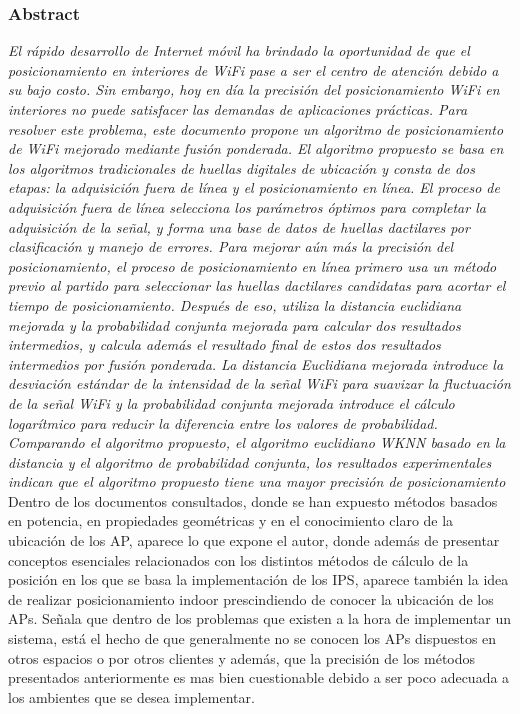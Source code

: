 \subsubsection{Abstract}
\emph{El rápido desarrollo de Internet móvil ha brindado la oportunidad de que el posicionamiento en interiores de WiFi pase a ser el centro de atención debido a su bajo costo. Sin embargo, hoy en día la precisión del posicionamiento WiFi en interiores no puede satisfacer las demandas de aplicaciones prácticas. Para resolver este problema, este documento propone un algoritmo de posicionamiento de WiFi mejorado mediante fusión ponderada. El algoritmo propuesto se basa en los algoritmos tradicionales de huellas digitales de ubicación y consta de dos etapas: la adquisición fuera de línea y el posicionamiento en línea. El proceso de adquisición fuera de línea selecciona los parámetros óptimos para completar la adquisición de la señal, y forma una base de datos de huellas dactilares por clasificación y manejo de errores. Para mejorar aún más la precisión del posicionamiento, el proceso de posicionamiento en línea primero usa un método previo al partido para seleccionar las huellas dactilares candidatas para acortar el tiempo de posicionamiento. Después de eso, utiliza la distancia euclidiana mejorada y la probabilidad conjunta mejorada para calcular dos resultados intermedios, y calcula además el resultado final de estos dos resultados intermedios por fusión ponderada. La distancia Euclidiana mejorada introduce la desviación estándar de la intensidad de la señal WiFi para suavizar la fluctuación de la señal WiFi y la probabilidad conjunta mejorada introduce el cálculo logarítmico para reducir la diferencia entre los valores de probabilidad. Comparando el algoritmo propuesto, el algoritmo euclidiano WKNN basado en la distancia y el algoritmo de probabilidad conjunta, los resultados experimentales indican que el algoritmo propuesto tiene una mayor precisión de posicionamiento}\\

Dentro de los documentos consultados, donde se han expuesto métodos basados en potencia, en propiedades geométricas y en el conocimiento claro de la ubicación de los AP, aparece lo que expone el autor, donde además de presentar conceptos esenciales relacionados con los distintos métodos de cálculo de la posición en los que se basa la implementación de los IPS, aparece también la idea de realizar posicionamiento indoor prescindiendo de conocer la ubicación de los APs. Señala que dentro de los problemas que existen a la hora de implementar un sistema, está el hecho de que generalmente no se conocen los APs dispuestos en otros espacios o por otros clientes y además, que la precisión de los métodos presentados anteriormente es mas bien cuestionable debido a ser poco adecuada a los ambientes que se desea implementar.\\

